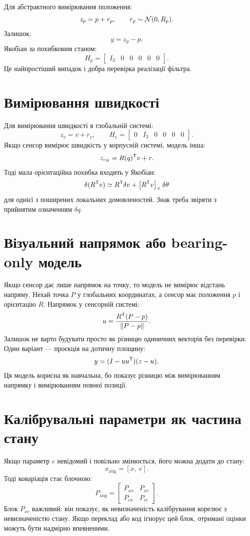Для абстрактного вимірювання положення:
\[
z_p = p + r_p,\qquad r_p\sim\mathcal{N}(0,R_p).
\]
Залишок:
\[
y = z_p-p.
\]
Якобіан за похибковим станом:
\[
H_p =
\begin{bmatrix}
I_3 & 0 & 0 & 0 & 0 & 0
\end{bmatrix}.
\]
Це найпростіший випадок і добра перевірка реалізації фільтра.

\section{Вимірювання швидкості}

Для вимірювання швидкості в глобальній системі:
\[
z_v = v+r_v,\qquad
H_v =
\begin{bmatrix}
0 & I_3 & 0 & 0 & 0 & 0
\end{bmatrix}.
\]
Якщо сенсор вимірює швидкість у корпусній системі, модель інша:
\[
z_{v_B} = R(q)^{\mathsf{T}} v + r.
\]
Тоді мала орієнтаційна похибка входить у Якобіан:
\[
\delta(R^{\mathsf{T}} v)\simeq R^{\mathsf{T}}\delta v + \left[R^{\mathsf{T}} v\right]_{\times}\delta\theta
\]
для однієї з поширених локальних домовленостей. Знак треба звіряти з прийнятим означенням $\delta q$.

\section{Візуальний напрямок або bearing-only модель}

Якщо сенсор дає лише напрямок на точку, то модель не вимірює відстань напряму. Нехай точка $P$ у глобальних координатах, а сенсор має положення $p$ і орієнтацію $R$. Напрямок у сенсорній системі:
\[
u = \frac{R^{\mathsf{T}}(P-p)}{\|P-p\|}.
\]
Залишок не варто будувати просто як різницю одиничних векторів без перевірки. Один варіант --- проєкція на дотичну площину:
\[
y = (I-uu^{\mathsf{T}})(z-u).
\]
Ця модель корисна як навчальна, бо показує різницю між вимірюванням напрямку і вимірюванням повної позиції.

\section{Калібрувальні параметри як частина стану}

Якщо параметр $c$ невідомий і повільно змінюється, його можна додати до стану:
\[
x_{\mathrm{aug}} = [x,\; c].
\]
Тоді коваріація стає блочною:
\[
P_{\mathrm{aug}} =
\begin{bmatrix}
P_{xx} & P_{xc}\\
P_{cx} & P_{cc}
\end{bmatrix}.
\]
Блок $P_{xc}$ важливий: він показує, як невизначеність калібрування корелює з невизначеністю стану. Якщо переклад або код ігнорує цей блок, отримані оцінки можуть бути надмірно впевненими.

